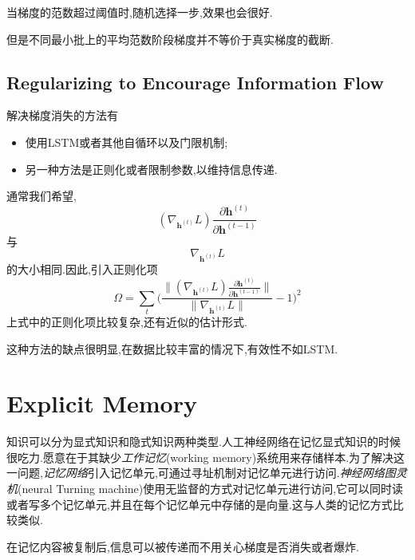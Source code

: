 当梯度的范数超过阈值时,随机选择一步,效果也会很好.

但是不同最小批上的平均范数阶段梯度并不等价于真实梯度的截断.

\subsection{Regularizing to Encourage Information Flow}

解决梯度消失的方法有
\begin{itemize}
    \item 使用LSTM或者其他自循环以及门限机制;
    \item 另一种方法是正则化或者限制参数,以维持信息传递.
\end{itemize}

通常我们希望,
\begin{equation}
(\nabla_{\bm h^{(t)}}L)\frac{\partial\bm h^{(t)}}{\partial\bm h^{(t-1)}}
\end{equation}
与
\begin{equation}
\nabla_{\bm h^{(t)}}L
\end{equation}
的大小相同.因此,引入正则化项
\begin{equation}
\Omega=\sum_t\Big(\frac{\|(\nabla_{\bm h^{(t)}}L)\frac{\partial\bm h^{(t)}}{\partial\bm h^{(t-1)}}\|}{\|\nabla_{\bm h^{(t)}}L\|}-1\Big)^2
\end{equation}
上式中的正则化项比较复杂,还有近似的估计形式.

这种方法的缺点很明显,在数据比较丰富的情况下,有效性不如LSTM.

\section{Explicit Memory}

知识可以分为显式知识和隐式知识两种类型.人工神经网络在记忆显式知识的时候很吃力.愿意在于其缺少\textit{工作记忆}(working memory)系统用来存储样本.为了解决这一问题,\textit{记忆网络}引入记忆单元,可通过寻址机制对记忆单元进行访问.\textit{神经网络图灵机}(neural Turning machine)使用无监督的方式对记忆单元进行访问,它可以同时读或者写多个记忆单元,并且在每个记忆单元中存储的是向量.这与人类的记忆方式比较类似.

在记忆内容被复制后,信息可以被传递而不用关心梯度是否消失或者爆炸.
